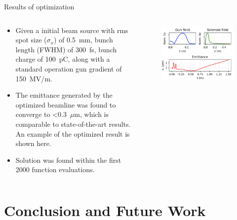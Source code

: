 \documentclass[aspectratio=169]{beamer}
\begin{document}
\begin{frame}{Results of optimization}
\begin{columns}
\begin{column}{0.6\textwidth}
\begin{itemize}
    \item Given a initial beam source with rms spot size ($\sigma_x$) of 0.5~mm, bunch length (FWHM) of 300~fs, bunch charge of 100~pC, along with a standard operation gun gradient of 150~MV/m.
    \item The emittance generated by the optimized beamline was found to converge to <0.3~$\mu$m, which is comparable to state-of-the-art results. An example of the optimized result is shown here.
    \item Solution was found within the first 2000 function evaluations.
\end{itemize}

\end{column}
\begin{column}{0.4\textwidth}
\begin{figure}
    \centering
        \includegraphics[height=0.7\textwidth]{optm1.png}
    \end{figure}
\end{column}
\end{columns}
\end{frame}

\section{Conclusion and Future Work}
\end{document}
